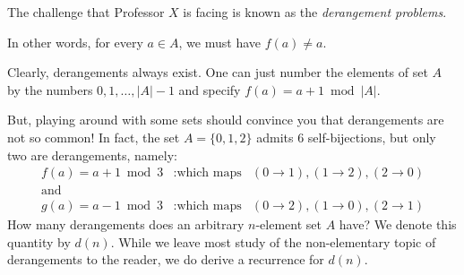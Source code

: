 The challenge that Professor $X$ is facing is known as the {\em derangement problems}.

\medskip

  In other words, for every $a \in A$, we must have $f(a) \neq a$.

\medskip

Clearly, derangements always exist.  One can just number the elements of set $A$ by the numbers
$0, 1, \ldots, |A|-1$ and specify $f(a) = a+1 \bmod |A|$.

But, playing around with some sets should convince you that derangements are not so common!
In fact, the set  $A = \{0, 1,2 \}$ admits $6$ self-bijections, but only two are derangements, namely:
\[
\begin{array}{lll}
f(a) = a+1 \bmod 3 &: \mbox{which maps} &(0 \rightarrow 1),  (1 \rightarrow 2), (2 \rightarrow 0) \\
\mbox{and} &  & \\
g(a) = a-1 \bmod 3 &: \mbox{which maps} & (0 \rightarrow 2),  (1 \rightarrow 0), (2 \rightarrow 1)
\end{array}
\]
How many derangements does an arbitrary $n$-element set $A$ have?   We denote this quantity
by $d(n)$.  While we leave most study of the non-elementary topic of derangements to the reader,
we do derive a recurrence for $d(n)$. 

\medskip

